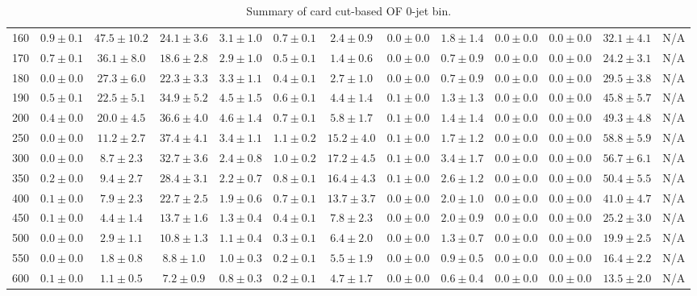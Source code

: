 \begin{table}
{\begin{center}
\begin{tabular}{l | c c | c c c c c c c c  | c c}
160 & $0.9\pm0.1$ & $47.5\pm10.2$ & $24.1\pm3.6$ & $3.1\pm1.0$ & $0.7\pm0.1$ & $2.4\pm0.9$ & $0.0\pm0.0$ & $1.8\pm1.4$ & $0.0\pm0.0$ & $0.0\pm0.0$ & $32.1\pm4.1$ & N/A \\
170 & $0.7\pm0.1$ & $36.1\pm8.0$ & $18.6\pm2.8$ & $2.9\pm1.0$ & $0.5\pm0.1$ & $1.4\pm0.6$ & $0.0\pm0.0$ & $0.7\pm0.9$ & $0.0\pm0.0$ & $0.0\pm0.0$ & $24.2\pm3.1$ & N/A \\
180 & $0.0\pm0.0$ & $27.3\pm6.0$ & $22.3\pm3.3$ & $3.3\pm1.1$ & $0.4\pm0.1$ & $2.7\pm1.0$ & $0.0\pm0.0$ & $0.7\pm0.9$ & $0.0\pm0.0$ & $0.0\pm0.0$ & $29.5\pm3.8$ & N/A \\
190 & $0.5\pm0.1$ & $22.5\pm5.1$ & $34.9\pm5.2$ & $4.5\pm1.5$ & $0.6\pm0.1$ & $4.4\pm1.4$ & $0.1\pm0.0$ & $1.3\pm1.3$ & $0.0\pm0.0$ & $0.0\pm0.0$ & $45.8\pm5.7$ & N/A \\
200 & $0.4\pm0.0$ & $20.0\pm4.5$ & $36.6\pm4.0$ & $4.6\pm1.4$ & $0.7\pm0.1$ & $5.8\pm1.7$ & $0.1\pm0.0$ & $1.4\pm1.4$ & $0.0\pm0.0$ & $0.0\pm0.0$ & $49.3\pm4.8$ & N/A \\
250 & $0.0\pm0.0$ & $11.2\pm2.7$ & $37.4\pm4.1$ & $3.4\pm1.1$ & $1.1\pm0.2$ & $15.2\pm4.0$ & $0.1\pm0.0$ & $1.7\pm1.2$ & $0.0\pm0.0$ & $0.0\pm0.0$ & $58.8\pm5.9$ & N/A \\
300 & $0.0\pm0.0$ & $8.7\pm2.3$ & $32.7\pm3.6$ & $2.4\pm0.8$ & $1.0\pm0.2$ & $17.2\pm4.5$ & $0.1\pm0.0$ & $3.4\pm1.7$ & $0.0\pm0.0$ & $0.0\pm0.0$ & $56.7\pm6.1$ & N/A \\
350 & $0.2\pm0.0$ & $9.4\pm2.7$ & $28.4\pm3.1$ & $2.2\pm0.7$ & $0.8\pm0.1$ & $16.4\pm4.3$ & $0.1\pm0.0$ & $2.6\pm1.2$ & $0.0\pm0.0$ & $0.0\pm0.0$ & $50.4\pm5.5$ & N/A \\
400 & $0.1\pm0.0$ & $7.9\pm2.3$ & $22.7\pm2.5$ & $1.9\pm0.6$ & $0.7\pm0.1$ & $13.7\pm3.7$ & $0.0\pm0.0$ & $2.0\pm1.0$ & $0.0\pm0.0$ & $0.0\pm0.0$ & $41.0\pm4.7$ & N/A \\
450 & $0.1\pm0.0$ & $4.4\pm1.4$ & $13.7\pm1.6$ & $1.3\pm0.4$ & $0.4\pm0.1$ & $7.8\pm2.3$ & $0.0\pm0.0$ & $2.0\pm0.9$ & $0.0\pm0.0$ & $0.0\pm0.0$ & $25.2\pm3.0$ & N/A \\
500 & $0.0\pm0.0$ & $2.9\pm1.1$ & $10.8\pm1.3$ & $1.1\pm0.4$ & $0.3\pm0.1$ & $6.4\pm2.0$ & $0.0\pm0.0$ & $1.3\pm0.7$ & $0.0\pm0.0$ & $0.0\pm0.0$ & $19.9\pm2.5$ & N/A \\
550 & $0.0\pm0.0$ & $1.8\pm0.8$ & $8.8\pm1.0$ & $1.0\pm0.3$ & $0.2\pm0.1$ & $5.5\pm1.9$ & $0.0\pm0.0$ & $0.9\pm0.5$ & $0.0\pm0.0$ & $0.0\pm0.0$ & $16.4\pm2.2$ & N/A \\
600 & $0.1\pm0.0$ & $1.1\pm0.5$ & $7.2\pm0.9$ & $0.8\pm0.3$ & $0.2\pm0.1$ & $4.7\pm1.7$ & $0.0\pm0.0$ & $0.6\pm0.4$ & $0.0\pm0.0$ & $0.0\pm0.0$ & $13.5\pm2.0$ & N/A \\
\hline
\end{tabular}
\end{center}
}
\caption{Summary of card cut-based OF 0-jet bin.}
\end{table}
